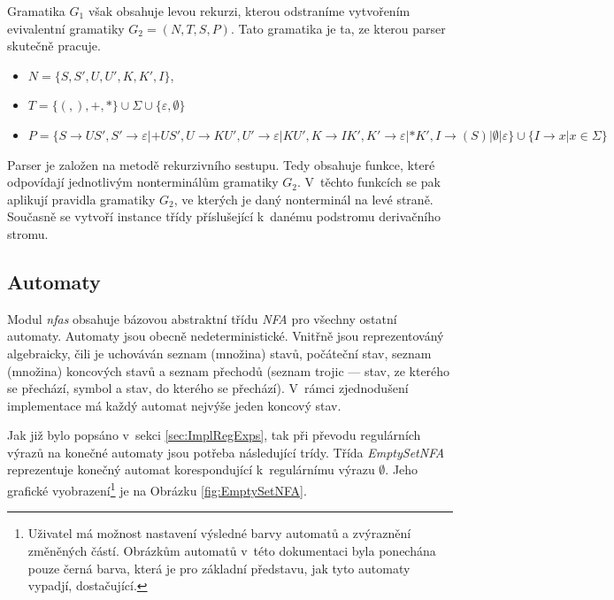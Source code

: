 \documentclass[10pt, notitlepage]{article}
\begin{document}
Gramatika $G_1$ však obsahuje levou rekurzi, kterou odstraníme vytvořením
evivalentní gramatiky $G_2 = (N, T, S, P)$. Tato gramatika je ta, ze kterou
parser skutečně pracuje.

\begin{itemize}
	\item $N = \{S, S', U, U', K, K', I\}$,

	\item $T = \{(, ), +, *\} \cup  \Sigma \cup \{\varepsilon, \emptyset\}$

	\item $P = \{S \rightarrow US', S' \rightarrow \varepsilon | +US', U
		\rightarrow KU', U' \rightarrow \varepsilon | KU', K \rightarrow IK', K'
		\rightarrow \varepsilon | *K', I \rightarrow (S) | \emptyset |
		\varepsilon\} \cup \{I \rightarrow x | x \in \Sigma\}$
\end{itemize}

Parser je založen na metodě rekurzivního sestupu. Tedy obsahuje funkce, které
odpovídají jednotlivým nonterminálům gramatiky $G_2$. V~těchto funkcích se pak
aplikují pravidla gramatiky $G_2$, ve kterých je daný nonterminál na levé
straně. Současně se vytvoří instance třídy příslušející k~danému podstromu
derivačního stromu.

\subsection{Automaty}
\label{sec:ImplAutomata}

Modul \emph{nfas} obsahuje bázovou abstraktní třídu \emph{NFA} pro všechny
ostatní automaty. Automaty jsou obecně nedeterministické. Vnitřně jsou
reprezentováný algebraicky, čili je uchováván seznam (množina) stavů, počáteční
stav, seznam (množina) koncových stavů a seznam přechodů (seznam trojic ---
stav, ze kterého se přechází, symbol a stav, do kterého se přechází).
V~rámci zjednodušení implementace má každý automat nejvýše jeden koncový stav.

Jak již bylo popsáno v~sekci \ref{sec:ImplRegExps}, tak při převodu regulárních
výrazů na konečné automaty jsou potřeba následující trídy. Třída
\emph{EmptySetNFA} reprezentuje konečný automat korespondující k~regulárnímu
výrazu $\emptyset$. Jeho grafické vyobrazení\footnote{Uživatel má možnost
nastavení výsledné barvy automatů a zvýraznění změněných částí. Obrázkům
automatů v~této dokumentaci byla ponechána pouze černá barva, která je pro
základní představu, jak tyto automaty vypadjí, dostačující.} je na Obrázku
\ref{fig:EmptySetNFA}.
\end{document}
